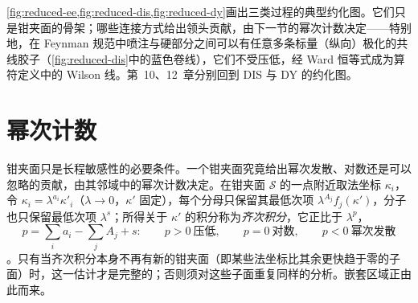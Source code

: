 \cref{fig:reduced-ee,fig:reduced-dis,fig:reduced-dy}画出三类过程的典型约化图。它们只是钳夹面的骨架；哪些连接方式给出领头贡献，由下一节的幂次计数决定——特别地，在 Feynman 规范中喷注与硬部分之间可以有任意多条标量（纵向）极化的共线胶子（\cref{fig:reduced-dis}中的蓝色卷线），它们不受压低，经 Ward 恒等式成为算符定义中的 Wilson 线。第~10、12~章分别回到 DIS 与 DY 的约化图。
\section{幂次计数}\label{sec:ir-power}

钳夹面只是长程敏感性的必要条件。一个钳夹面究竟给出幂次发散、对数还是可以忽略的贡献，由其邻域中的幂次计数决定\cite[第~2.3~节]{Sterman:1995fz}。在钳夹面 $\mathcal S$ 的一点附近取法坐标 $\kappa_i$，令 $\kappa_i=\lambda^{a_i}\kappa'_i$（$\lambda\to0$，$\kappa'$ 固定），每个分母只保留其最低次项 $\lambda^{A_j}f_j(\kappa')$，分子也只保留最低次项 $\lambda^{s}$；所得关于 $\kappa'$ 的积分称为\emph{齐次积分}，它正比于 $\lambda^{p}$，
\begin{equation}\label{eq:ir-pgeneric}
p=\sum_ia_i-\sum_jA_j+s :\qquad p>0\ \text{压低},\qquad p=0\ \text{对数},\qquad p<0\ \text{幂次发散}
\end{equation}
\cite[式~(60)--(62)]{Sterman:1995fz}。只有当齐次积分本身不再有新的钳夹面（即某些法坐标比其余更快趋于零的子面）时，这一估计才是完整的；否则须对这些子面重复同样的分析。嵌套区域正由此而来。

